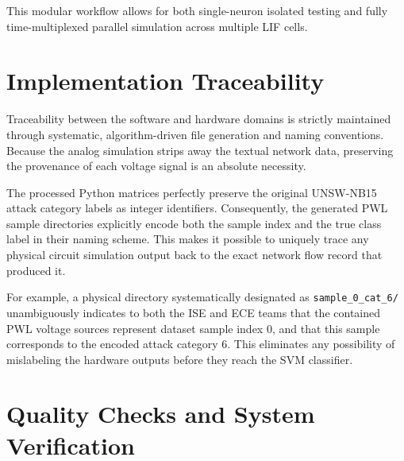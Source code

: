 This modular workflow allows for both single-neuron isolated testing and fully time-multiplexed parallel simulation across multiple LIF cells.

\section{Implementation Traceability}

Traceability between the software and hardware domains is strictly maintained through systematic, algorithm-driven file generation and naming conventions. Because the analog simulation strips away the textual network data, preserving the provenance of each voltage signal is an absolute necessity.

The processed Python matrices perfectly preserve the original UNSW-NB15 attack category labels as integer identifiers. Consequently, the generated PWL sample directories explicitly encode both the sample index and the true class label in their naming scheme. This makes it possible to uniquely trace any physical circuit simulation output back to the exact network flow record that produced it. 

For example, a physical directory systematically designated as \texttt{sample\_0\_cat\_6/} unambiguously indicates to both the ISE and ECE teams that the contained PWL voltage sources represent dataset sample index 0, and that this sample corresponds to the encoded attack category 6. This eliminates any possibility of mislabeling the hardware outputs before they reach the SVM classifier.

\section{Quality Checks and System Verification}


